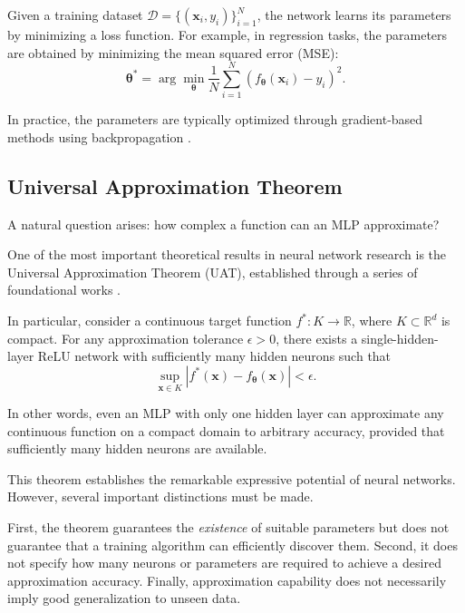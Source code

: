 \documentclass[12pt]{article}
\numberwithin{equation}{section}  %
\begin{document}
Given a training dataset $\mathcal{D}=\{(\mathbf{x}_i,y_i)\}_{i=1}^{N}$, the network learns its parameters by minimizing a loss function. For example, in regression tasks, the parameters are obtained by minimizing the mean squared error (MSE):
\begin{equation}
    \boldsymbol{\theta}^*
    =\arg\min_{\boldsymbol{\theta}}
    \frac{1}{N}\sum_{i=1}^{N}
    \left(f_{\boldsymbol{\theta}}(\mathbf{x}_i)-y_i\right)^2.
    \label{eq:mlp_training}
\end{equation}

In practice, the parameters are typically optimized through gradient-based methods using backpropagation \cite{rumelhart1986learning}.

\subsection{Universal Approximation Theorem}

A natural question arises: how complex a function can an MLP approximate?

One of the most important theoretical results in neural network research is the Universal Approximation Theorem (UAT), established through a series of foundational works \cite{cybenko1989approximation,leshno1993multilayer}.

In particular, consider a continuous target function $f^*:K\rightarrow\mathbb{R}$, where $K\subset\mathbb{R}^d$ is compact. For any approximation tolerance $\epsilon>0$, there exists a single-hidden-layer ReLU network with sufficiently many hidden neurons such that
\begin{equation}
    \boxed{
    \sup_{\mathbf{x}\in K}
    \left|f^*(\mathbf{x})
    -f_{\boldsymbol{\theta}}(\mathbf{x})\right|
    <\epsilon
    }.
    \label{eq:universal_approximation}
\end{equation}

In other words, even an MLP with only one hidden layer can approximate any continuous function on a compact domain to arbitrary accuracy, provided that sufficiently many hidden neurons are available.

This theorem establishes the remarkable expressive potential of neural networks. However, several important distinctions must be made.

First, the theorem guarantees the \emph{existence} of suitable parameters but does not guarantee that a training algorithm can efficiently discover them. Second, it does not specify how many neurons or parameters are required to achieve a desired approximation accuracy. Finally, approximation capability does not necessarily imply good generalization to unseen data.
\end{document}
